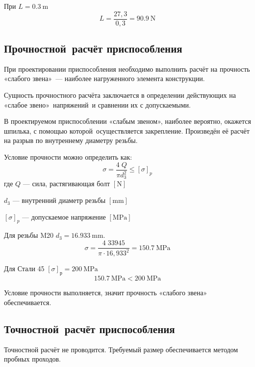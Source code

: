 \documentclass[14pt,russian,a4paper]{extreport}
\begin{document}
При $L = \SI{0,3}{\meter}$
\begin{equation*}
  L = \frac{27,3}{0,3} = \SI{90,9}{\newton}
\end{equation*}

\subsection{Прочностной расчёт приспособления}

При проектировании приспособления необходимо выполнить расчёт на прочность «слабого звена» --- наиболее нагруженного элемента конструкции.

Сущность прочностного расчёта заключается в определении действующих на «слабое звено» напряжений и сравнении их с допускаемыми.

В проектируемом приспособлении «слабым звеном», наиболее вероятно, окажется шпилька, с помощью которой осуществляется закрепление. Произведён её расчёт на разрыв по внутреннему диаметру резьбы.

Условие прочности можно определить как: \cite[форм.~14.6]{ryahovskiy:dm}
\begin{equation*}
  \sigma = \frac{4 \; Q}{\pi d_3^2} \leq \left[ \sigma \right]_p
\end{equation*}
где $Q$ --- сила, растягивающая болт $\left[\si{\newton}\right]$ \par
$d_3$ --- внутренний диаметр резьбы $\left[\si{\milli\meter}\right]$ \par
$\left[ \sigma \right]_p$ --- допускаемое напряжение $\left[\si{\mega\pascal}\right]$

Для резьбы M20 $ d_3 = \SI{16,933}{\milli\meter} $.
\begin{equation*}
  \sigma = \frac{4 \; 33945}{\pi \cdot 16,933^2} = \SI{150,7}{\mega\pascal}
\end{equation*}

Для Стали 45 $ \left[\sigma\right]_\text{р} = \SI{200}{\mega\pascal} $
\begin{equation*}
  \SI{150,7}{\mega\pascal} < \SI{200}{\mega\pascal}
\end{equation*}

Условие прочности выполняется, значит прочность «слабого звена» обеспечивается.

\subsection{Точностной расчёт приспособления}

Точностной расчёт не проводится. Требуемый размер обеспечивается методом пробных проходов.



\nocite{malvyat:okp}

\nocite{burtsev:tm2}
\nocite{bezyazichny:otm}
\nocite{blumenstejn:pto}
\nocite{kosilova:stm2}
\nocite{tarabarin:pto}
\nocite{gost:14-205-83}
\nocite{gost:3-1118-88}
\nocite{gost:2-105-95}
\nocite{gost:3-1702-79}

\printbibliography[heading=none]
\end{document}
